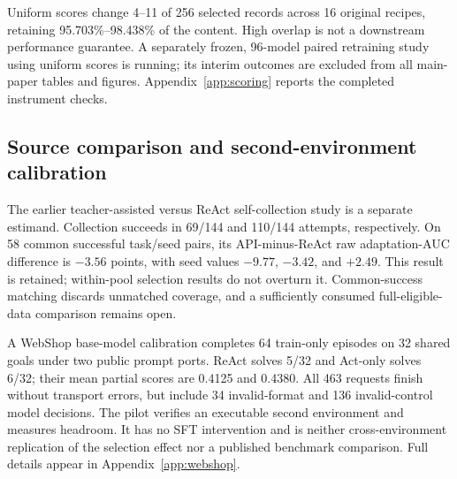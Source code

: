 Uniform scores change 4--11 of 256 selected records across 16 original recipes, retaining 95.703\%--98.438\% of the content. High overlap is not a downstream performance guarantee. A separately frozen, 96-model paired retraining study using uniform scores is running; its interim outcomes are excluded from all main-paper tables and figures. Appendix~\ref{app:scoring} reports the completed instrument checks.

\subsection{Source comparison and second-environment calibration}
\label{sec:scope}
The earlier teacher-assisted versus ReAct self-collection study is a separate estimand. Collection succeeds in 69/144 and 110/144 attempts, respectively. On 58 common successful task/seed pairs, its API-minus-ReAct raw adaptation-AUC difference is $-3.56$ points, with seed values $-9.77$, $-3.42$, and $+2.49$. This result is retained; within-pool selection results do not overturn it. Common-success matching discards unmatched coverage, and a sufficiently consumed full-eligible-data comparison remains open.

A WebShop base-model calibration completes 64 train-only episodes on 32 shared goals under two public prompt ports. ReAct solves 5/32 and Act-only solves 6/32; their mean partial scores are 0.4125 and 0.4380. All 463 requests finish without transport errors, but include 34 invalid-format and 136 invalid-control model decisions. The pilot verifies an executable second environment and measures headroom. It has no SFT intervention and is neither cross-environment replication of the selection effect nor a published benchmark comparison. Full details appear in Appendix~\ref{app:webshop}.
